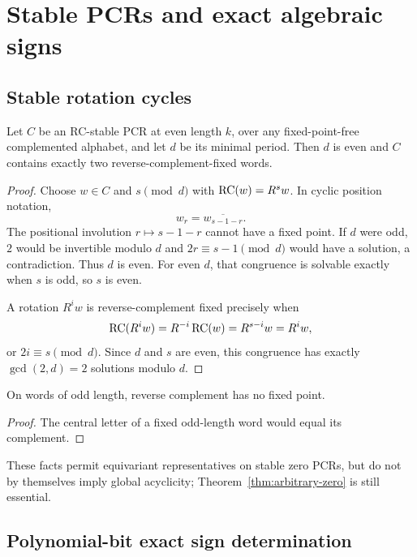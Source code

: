 \section{Stable PCRs and exact algebraic signs}
\label{app:technical}

\subsection{Stable rotation cycles}

\begin{lemma}
\label{lem:stable-pcr}
Let $C$ be an RC-stable PCR at even length $k$, over any fixed-point-free
complemented alphabet, and let $d$ be its minimal period.  Then $d$ is even
and $C$ contains exactly two reverse-complement-fixed words.
\end{lemma}

\begin{proof}
Choose $w\in C$ and $s\pmod d$ with $\operatorname{RC}(w)=R^sw$.  In cyclic position
notation,
\[
  w_r=\overline{w_{s-1-r}}.
\]
The positional involution $r\mapsto s-1-r$ cannot have a fixed point.  If
$d$ were odd, $2$ would be invertible modulo $d$ and
$2r\equiv s-1\pmod d$ would have a solution, a contradiction.  Thus $d$ is
even.  For even $d$, that congruence is solvable exactly when $s$ is odd, so
$s$ is even.

A rotation $R^iw$ is reverse-complement fixed precisely when
\[
  \operatorname{RC}(R^iw)=R^{-i}\operatorname{RC}(w)=R^{s-i}w=R^iw,
\]
or $2i\equiv s\pmod d$.  Since $d$ and $s$ are even, this congruence has
exactly $\gcd(2,d)=2$ solutions modulo $d$.
\end{proof}

\begin{lemma}
On words of odd length, reverse complement has no fixed point.
\end{lemma}

\begin{proof}
The central letter of a fixed odd-length word would equal its complement.
\end{proof}

These facts permit equivariant representatives on stable zero PCRs, but do
not by themselves imply global acyclicity; Theorem~\ref{thm:arbitrary-zero}
is still essential.

\subsection{Polynomial-bit exact sign determination}

